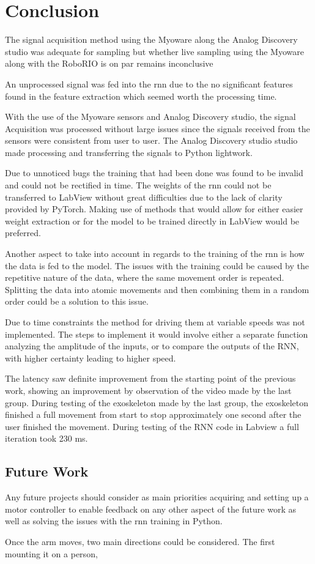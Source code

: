 \section{Conclusion}

The signal acquisition method using the Myoware along the Analog Discovery studio was adequate for sampling but whether live sampling using the Myoware along with the RoboRIO is on par remains inconclusive 

An unprocessed signal was fed into the \acrshort{rnn} due to the no significant features found in the feature extraction which seemed worth the processing time.


With the use of the Myoware sensors and Analog Discovery studio, the signal Acquisition was processed without large issues since the signals received from the sensors were consistent from user to user. 
The Analog Discovery studio studio made processing and transferring the signals to Python lightwork.

Due to unnoticed bugs the training that had been done was found to be invalid and could not be rectified in time.
The weights of the \acrshort{rnn} could not be transferred to LabView without great difficulties due to the lack of clarity provided by
PyTorch. Making use of methods that would allow for either easier weight extraction or for the model to be trained
directly in LabView would be preferred.

Another aspect to take into account in regards to the training of the \acrshort{rnn} is how the data is fed to the model. The issues
with the training could be caused by the repetitive nature of the data, where the same movement order is repeated. Splitting the data
into atomic movements and then combining them in a random order could be a solution to this issue.

Due to time constraints the method for driving them at variable speeds was not implemented. The steps to implement it
would involve either a separate function analyzing the amplitude of the inputs, or to compare the outputs of the RNN,
with higher certainty leading to higher speed.

The latency saw definite improvement from the starting point of the previous work, showing an improvement by observation of the video made by the last group. During testing of the exoskeleton made by the last group,
the exoskeleton finished a full movement from start to stop approximately one second after the user finished the movement. During testing of the RNN code in Labview a full iteration took 230 ms.

\subsection{Future Work}

Any future projects should consider as main priorities acquiring and setting up a motor controller to enable feedback on any other aspect of the future work
as well as solving the issues with the \acrshort{rnn} training in Python.

Once the arm moves, two main directions could be considered. The first mounting it on a person, 